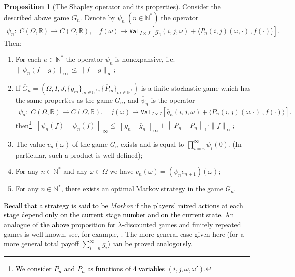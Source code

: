 \documentclass[english,openary,12pt]{article}
\newcommand{\red}[1]{\textcolor{black}{#1}}
\theoremstyle{definition}
\newtheorem{proposition}{Proposition}
\newcommand{\R}{\mathbb{R}}
\newcommand{\N}{\mathbb{N}}
\begin{document}
\begin{proposition}[The Shapley operator and its properties]
  \label{shapley}
  Consider the described above game $G_n$. 
  Denote by $\psi_n \: (n \in \N^*)$ the operator
  \begin{align*}
    \psi_n : \; C(\Omega, \R) \to C(\Omega, \R), \quad
    f(\omega) \mapsto
    \texttt{Val}_{I \times J} 
    [g_n(i,j,\omega) + \langle P_n(i,j)(\omega,\cdot)\,, f(\cdot)\rangle].
  \end{align*}
  Then:
  \begin{enumerate}
    \item For each $n\in \N^*$ the operator $\psi_n$ is nonexpansive, i.e.
    $\|\psi_n(f - g)\|_\infty \le \|f-g\|_\infty$;
    \item If $\overline G_n = (\Omega, I, J, \{\overline g_m\}_{m\in\N^*}, \{\overline P_m\}_{m\in\N^*})$ is a finite stochastic game which has the same properties as the game $G_n$, and $\overline \psi_n$ is the operator
    \begin{align*}
      \overline \psi_n : \; C(\Omega, \R) \to
      C(\Omega, \R), \quad
      f(\omega) \mapsto
      \texttt{Val}_{I \times J} 
      \left[\overline g_n(i,j,\omega) + 
      \langle \overline P_n(i,j)(\omega,\cdot)\,, f(\cdot)\rangle\right],
    \end{align*}
    then\footnote{\red{We consider $P_n$ and $\overline P_n$ as functions of 4 variables $(i, j, \omega, \omega')$.}}
    $\left\|\psi_n(f) - \overline \psi_n(f)\right\|_\infty \le
    \left\| g_n - \overline g_n\right\|_\infty
    + \left\|P_n - \overline P_n\right\|_1 \cdot \|f\|_\infty;$
    \item The value $v_n(\omega)$ of the game $G_n$ exists and is equal to
    $\prod\nolimits_{i=n}^\infty \psi_i (0)$. (In particular, 
    such a product is well-defined);
    \item For any $n\in\N^*$ and any $\omega \in \Omega$ we have
    $v_n(\omega) = (\psi_n v_{n+1})(\omega);$
    \item For any $n \in \N^*$, there exists an optimal Markov strategy
    in the game $G_n$.
  \end{enumerate}  
\end{proposition}

\red{Recall that a strategy is said to be \emph{Markov} if the players' mixed actions at each stage depend only on the current stage number and on the current state.} An analogue of \red{the above} proposition for $\lambda$-discounted games and
finitely repeated games is well-known, see, for example,
\cite[Theorem~IV.3.2, Proposition~IV.3.3]{MerSorZam15}. The more general case
given here (for a more general total payoff $\sum\nolimits_{i=n}^\infty g_i$) can be proved analogously.
\end{document}
